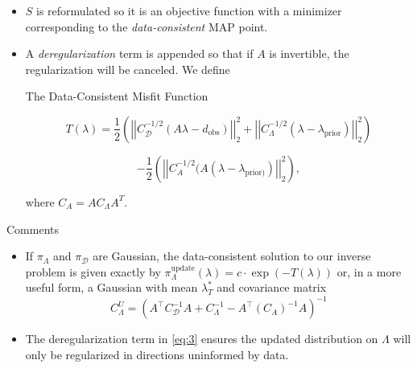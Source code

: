 \documentclass[11pt]{beamer}
\begin{document}
\begin{frame}

\begin{itemize}




	\item $S$ is reformulated so it is an objective function with a minimizer corresponding to the \textit{data-consistent} MAP point. 
	
		\item A \textit{deregularization} term is appended so that if $A$ is invertible, the regularization will be canceled. We define
	
\begin{block}{The Data-Consistent Misfit Function \footnotemark[1]}


$$T(\lambda)=\frac{1}{2}\left(\left|\left|C_\mathcal{D}^{-1/2}(A\lambda-d_{\text{obs}})\right|\right|_2^2+\left|\left|C_\Lambda^{-1/2}(\lambda-\lambda_{\text{prior}})\right|\right|_2^2\right)$$
	

\begin{equation} \label{eq:3}
-\frac{1}{2}\left(\left|\left|C_A^{-1/2}(A(\lambda-\lambda_{\text{prior})})\right|\right|_2^2\right),
\end{equation} 

\noindent where $C_A=AC_\Lambda A^T$. 
	
\end{block}


\end{itemize}


\end{frame}


\begin{frame}


\begin{block}{Comments}
\begin{itemize}



	\item If $\pi_\Lambda$ and $\pi_\mathcal{D}$ are Gaussian, the data-consistent solution to our inverse problem is given exactly by $\pi_\Lambda^\text{update}(\lambda)= c\cdot \exp(-T(\lambda))$ or, in a more useful form, a Gaussian with mean $\lambda_T^*$ and 
	covariance matrix 
	$$
	C^U_\Lambda = (A^\top C_\mathcal{D}^{-1}A + C_\Lambda^{-1} -A^\top(C_A)^{-1}A)^{-1}
	$$


	\item The deregularization term in \eqref{eq:3} ensures the updated  distribution on $\Lambda$ will only be regularized in directions uninformed by data.
	
\end{itemize}
\end{block}


\end{frame}
\end{document}
